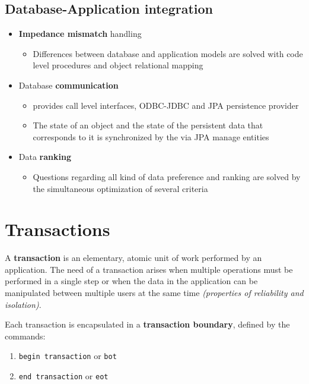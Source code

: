\documentclass[english]{article}
\begin{document}
\subsection{Database-Application integration}

\begin{itemize}
  \item \textbf{Impedance mismatch} handling
        \begin{itemize}[label=\(\rightarrow\)]
          \item Differences between database and application models are solved with code level procedures and object relational mapping
        \end{itemize}
  \item Database \textbf{communication}
        \begin{itemize}[label=\(\rightarrow\)]
          \item \DBMS provides call level interfaces, ODBC-JDBC and JPA persistence provider
          \item The state of an object and the state of the persistent data that corresponds to it is synchronized by the \DBMS via JPA manage entities
        \end{itemize}
  \item Data \textbf{ranking}
        \begin{itemize}[label=\(\rightarrow\)]
          \item Questions regarding all kind of data preference and ranking are solved by the simultaneous optimization of several criteria
        \end{itemize}
\end{itemize}

\clearpage

\section{Transactions}

A \textbf{transaction} is an elementary, atomic unit of work performed by an application.
The need of a transaction arises when multiple operations must be performed in a single step or when the data in the application can be manipulated between multiple users at the same time \textit{(properties of reliability and isolation)}.

Each transaction is encapsulated in a \textbf{transaction boundary}, defined by the commands:

\begin{enumerate}
  \item \texttt{begin transaction} or \texttt{bot}
  \item \texttt{end transaction} or \texttt{eot}
\end{enumerate}
\end{document}
